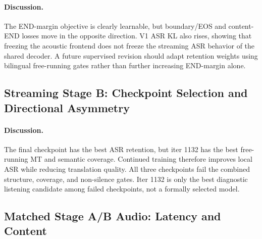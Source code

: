 \documentclass[11pt,a4paper]{article}
\begin{document}
\paragraph{Discussion.}
The END-margin objective is clearly learnable, but boundary/EOS and content-END losses move in the opposite direction. V1 ASR KL also rises, showing that freezing the acoustic frontend does not freeze the streaming ASR behavior of the shared decoder. A future supervised revision should adapt retention weights using bilingual free-running gates rather than further increasing END-margin alone.

\subsection{Streaming Stage B: Checkpoint Selection and Directional Asymmetry}

\begin{table}[H]
\centering
\caption{Fixed-16 free-running validation for three Stage B checkpoints. Lower ASR error and higher chrF/coverage are better.}
\label{tab:stageb_ckpt}
\end{table}

\paragraph{Discussion.}
The final checkpoint has the best ASR retention, but iter 1132 has the best free-running MT and semantic coverage. Continued training therefore improves local ASR while reducing translation quality. All three checkpoints fail the combined structure, coverage, and non-silence gates. Iter 1132 is only the best diagnostic listening candidate among failed checkpoints, not a formally selected model.

\subsection{Matched Stage A/B Audio: Latency and Content}
\end{document}
